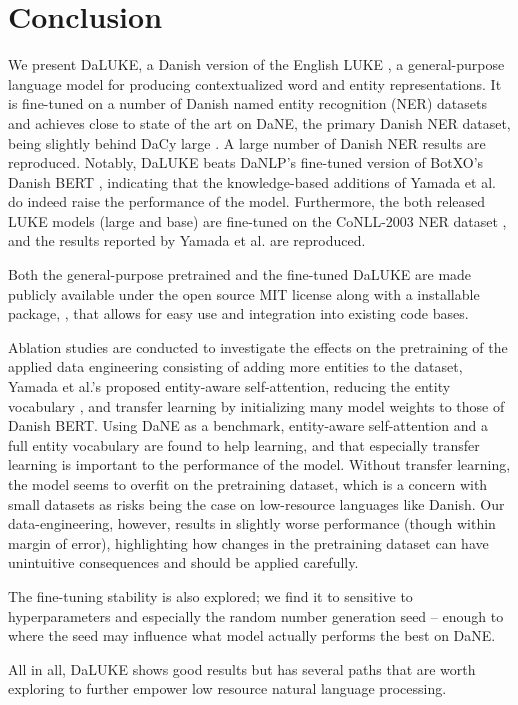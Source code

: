 \documentclass[main.tex]{subfiles}
\begin{document}
\chapter{Conclusion}
We present DaLUKE, a Danish version of the English LUKE \cite{yamada2020luke}, a general-purpose language model for producing contextualized word and entity representations.
It is fine-tuned on a number of Danish named entity recognition (NER) datasets and achieves close to state of the art on DaNE, the primary Danish NER dataset, being slightly behind DaCy large \cite{enevoldsen2020dacy}.
A large number of Danish NER results are reproduced.
Notably, DaLUKE beats DaNLP's fine-tuned version of BotXO's Danish BERT \cite{danlp2021, botxo2019dabert}, indicating that the knowledge-based additions of Yamada et al. \cite{yamada2020luke} do indeed raise the performance of the model.
Furthermore, the both released LUKE models (large and base) are fine-tuned on the CoNLL-2003 NER dataset \cite{tjang2003conll}, and the results reported by Yamada et al. are reproduced.

Both the general-purpose pretrained and the fine-tuned DaLUKE are made publicly available under the open source MIT license \cite{mitlicense} along with a  installable package, , that allows for easy use and integration into existing code bases.

Ablation studies are conducted to investigate the effects on the pretraining of the applied data engineering consisting of adding more entities to the dataset, Yamada et al.'s proposed entity-aware self-attention, reducing the entity vocabulary \cite{yamada2020luke}, and transfer learning by initializing many model weights to those of Danish BERT.
Using DaNE as a benchmark, entity-aware self-attention and a full entity vocabulary are found to help learning, and that especially transfer learning is important to the performance of the model.
Without transfer learning, the model seems to overfit on the pretraining dataset, which is a concern with small datasets as risks being the case on low-resource languages like Danish.
Our data-engineering, however, results in slightly worse performance (though within margin of error), highlighting how changes in the pretraining dataset can have unintuitive consequences and should be applied carefully.

The fine-tuning stability is also explored; we find it to sensitive to hyperparameters and especially the random number generation seed -- enough to where the seed may influence what model actually performs the best on DaNE.

All in all, DaLUKE shows good results but has several paths that are worth exploring to further empower low resource natural language processing.
\end{document}
